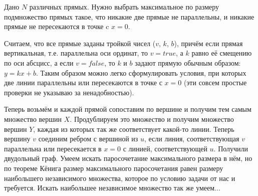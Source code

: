 \begin{task}[5]
Дано $N$ различных прямых. Нужно выбрать максимальное по размеру подмножество прямых
такое, что никакие две прямые не параллельны, и никакие прямые не пересекаются в точке c
$x = 0$.
\end{task}
\begin{solution}
Считаем, что все прямые заданы тройкой чисел ($v$, $k$, $b$), причём если прямая вертикальная, т.е. параллельна оси ординат, то $v = true$, а $k$ равно её смещению по оси абсцисс, а если $v = false$, то $k$ и $b$ задают прямую обычным образом: $y = kx + b$. Таким образом можно легко сформулировать условия, при которых две линии параллельны или пересекаются в точке с $x = 0$ (эти совсем простые проверки не указываю за ненадобностью).

Теперь возьмём и каждой прямой сопоставим по вершине и получим тем самым множество вершин $X$. Продублируем это множество и получим множество вершин $Y$, каждая из которых так же соответствует какой-то линии. Теперь вершину $v$ соединим ребром с вершиной из $u$, если линия, соответствующая $v$ параллельна или пересекается в $x = 0$ с линией, соответствующей $u$. Получили двудольный граф. Умеем искать паросочетание максимального размера в нём, но по теореме Кёнига размер максимального паросочетания равен размеру наибольшего независимого множества, которое по условию задачи от нас и требуется. Искать наибольшее независимое множество так же умеем...\xqed
\end{solution}

